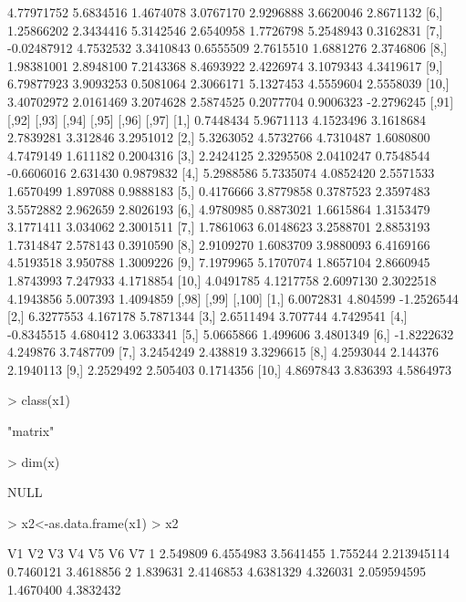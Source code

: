 \documentclass[12pt]{article}
\begin{document}
\begin{Schunk}
\begin{Soutput}
 [5,]  4.77971752 5.6834516  1.4674078 3.0767170 2.9296888 3.6620046  2.8671132
 [6,]  1.25866202 2.3434416  5.3142546 2.6540958 1.7726798 5.2548943  0.3162831
 [7,] -0.02487912 4.7532532  3.3410843 0.6555509 2.7615510 1.6881276  2.3746806
 [8,]  1.98381001 2.8948100  7.2143368 8.4693922 2.4226974 3.1079343  4.3419617
 [9,]  6.79877923 3.9093253  0.5081064 2.3066171 5.1327453 4.5559604  2.5558039
[10,]  3.40702972 2.0161469  3.2074628 2.5874525 0.2077704 0.9006323 -2.2796245
          [,91]     [,92]     [,93]     [,94]      [,95]    [,96]     [,97]
 [1,] 0.7448434 5.9671113 4.1523496 3.1618684  2.7839281 3.312846 3.2951012
 [2,] 5.3263052 4.5732766 4.7310487 1.6080800  4.7479149 1.611182 0.2004316
 [3,] 2.2424125 2.3295508 2.0410247 0.7548544 -0.6606016 2.631430 0.9879832
 [4,] 5.2988586 5.7335074 4.0852420 2.5571533  1.6570499 1.897088 0.9888183
 [5,] 0.4176666 3.8779858 0.3787523 2.3597483  3.5572882 2.962659 2.8026193
 [6,] 4.9780985 0.8873021 1.6615864 1.3153479  3.1771411 3.034062 2.3001511
 [7,] 1.7861063 6.0148623 3.2588701 2.8853193  1.7314847 2.578143 0.3910590
 [8,] 2.9109270 1.6083709 3.9880093 6.4169166  4.5193518 3.950788 1.3009226
 [9,] 7.1979965 5.1707074 1.8657104 2.8660945  1.8743993 7.247933 4.1718854
[10,] 4.0491785 4.1217758 2.6097130 2.3022518  4.1943856 5.007393 1.4094859
           [,98]    [,99]     [,100]
 [1,]  6.0072831 4.804599 -1.2526544
 [2,]  6.3277553 4.167178  5.7871344
 [3,]  2.6511494 3.707744  4.7429541
 [4,] -0.8345515 4.680412  3.0633341
 [5,]  5.0665866 1.499606  3.4801349
 [6,] -1.8222632 4.249876  3.7487709
 [7,]  3.2454249 2.438819  3.3296615
 [8,]  4.2593044 2.144376  2.1940113
 [9,]  2.2529492 2.505403  0.1714356
[10,]  4.8697843 3.836393  4.5864973
\end{Soutput}
\begin{Sinput}
> class(x1)
\end{Sinput}
\begin{Soutput}
[1] "matrix"
\end{Soutput}
\begin{Sinput}
> dim(x)
\end{Sinput}
\begin{Soutput}
NULL
\end{Soutput}
\begin{Sinput}
> x2<-as.data.frame(x1)
> x2
\end{Sinput}
\begin{Soutput}
         V1        V2         V3       V4           V5        V6         V7
1  2.549809 6.4554983  3.5641455 1.755244  2.213945114 0.7460121  3.4618856
2  1.839631 2.4146853  4.6381329 4.326031  2.059594595 1.4670400  4.3832432

\end{Soutput}
\end{Schunk}
\end{document}
